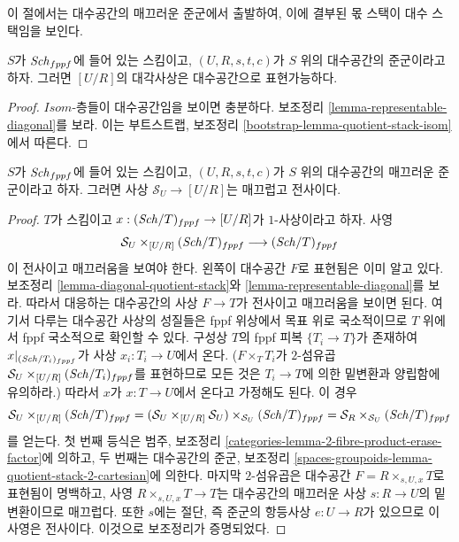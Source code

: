 \noindent
이 절에서는 대수공간의 매끄러운 준군에서 출발하여, 이에 결부된 몫 스택이
대수 스택임을 보인다.

\begin{lemma}
\label{lemma-diagonal-quotient-stack}
$S$가 $\mathit{Sch}_{fppf}$에 들어 있는 스킴이고,
$(U, R, s, t, c)$가 $S$ 위의 대수공간의 준군이라고 하자. 그러면
$[U/R]$의 대각사상은 대수공간으로 표현가능하다.
\end{lemma}

\begin{proof}
$\mathit{Isom}$-층들이 대수공간임을 보이면 충분하다. 보조정리
\ref{lemma-representable-diagonal}를 보라. 이는 부트스트랩, 보조정리
\ref{bootstrap-lemma-quotient-stack-isom}에서 따른다.
\end{proof}

\begin{lemma}
\label{lemma-smooth-quotient-smooth-presentation}
$S$가 $\mathit{Sch}_{fppf}$에 들어 있는 스킴이고,
$(U, R, s, t, c)$가 $S$ 위의 대수공간의 매끄러운 준군이라고 하자.
그러면 사상 $\mathcal{S}_U \to [U/R]$는 매끄럽고 전사이다.
\end{lemma}

\begin{proof}
$T$가 스킴이고 $x : (\mathit{Sch}/T)_{fppf} \to [U/R]$가 $1$-사상이라고 하자.
사영
$$
\mathcal{S}_U \times_{[U/R]} (\mathit{Sch}/T)_{fppf}
\longrightarrow
(\mathit{Sch}/T)_{fppf}
$$
이 전사이고 매끄러움을 보여야 한다. 왼쪽이 대수공간 $F$로 표현됨은 이미
알고 있다. 보조정리 \ref{lemma-diagonal-quotient-stack}와
\ref{lemma-representable-diagonal}를 보라. 따라서 대응하는 대수공간의
사상 $F \to T$가 전사이고 매끄러움을 보이면 된다. 여기서 다루는
대수공간 사상의 성질들은 fppf 위상에서 목표 위로 국소적이므로 $T$ 위에서
fppf 국소적으로 확인할 수 있다. 구성상 $T$의 fppf 피복
$\{T_i \to T\}$가 존재하여 $x|_{(\mathit{Sch}/T_i)_{fppf}}$가 사상
$x_i : T_i \to U$에서 온다. ($F \times_T T_i$가 $2$-섬유곱
$\mathcal{S}_U \times_{[U/R]} (\mathit{Sch}/T_i)_{fppf}$를 표현하므로 모든 것은
$T_i \to T$에 의한 밑변환과 양립함에 유의하라.) 따라서 $x$가
$x : T \to U$에서 온다고 가정해도 된다. 이 경우
$$
\mathcal{S}_U \times_{[U/R]} (\mathit{Sch}/T)_{fppf}
=
(\mathcal{S}_U \times_{[U/R]} \mathcal{S}_U)
\times_{\mathcal{S}_U} (\mathit{Sch}/T)_{fppf}
=
\mathcal{S}_R \times_{\mathcal{S}_U} (\mathit{Sch}/T)_{fppf}
$$
를 얻는다. 첫 번째 등식은 범주, 보조정리
\ref{categories-lemma-2-fibre-product-erase-factor}에 의하고, 두 번째는
대수공간의 준군, 보조정리
\ref{spaces-groupoids-lemma-quotient-stack-2-cartesian}에 의한다. 마지막
$2$-섬유곱은 대수공간 $F = R \times_{s, U, x} T$로 표현됨이 명백하고,
사영 $R \times_{s, U, x} T \to T$는 대수공간의 매끄러운 사상
$s : R \to U$의 밑변환이므로 매끄럽다. 또한 $s$에는 절단, 즉 준군의
항등사상 $e : U \to R$가 있으므로 이 사영은 전사이다. 이것으로
보조정리가 증명되었다.
\end{proof}

